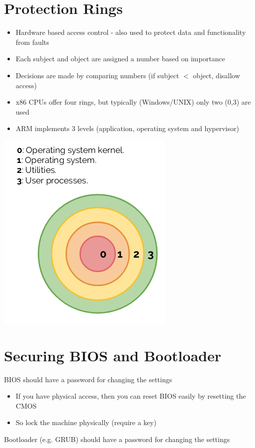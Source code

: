 \documentclass{article}[18pt]
\begin{document}
\section{Protection Rings}
\begin{itemize}
	\item Hardware based access control - also used to protect data and functionality from faults
	\item Each subject and object are assigned a number based on importance
	\item Decisions are made by comparing numbers (if subject $<$ object, disallow access)
	\item x86 CPUs offer four rings, but typically (Windows/UNIX) only two (0,3) are used
	\item ARM implements 3 levels (application, operating system and hypervisor)
\end{itemize}
\begin{center}
	\includegraphics[scale=0.7]{protection_ring}
\end{center}

\section{Securing BIOS and Bootloader}
BIOS should have a password for changing the settings
\begin{itemize}
	\item If you have physical access, then you can reset BIOS easily by resetting the CMOS
	\item So lock the machine physically (require a key)
\end{itemize}
Bootloader (e.g. GRUB) should have a password for changing the settings
\end{document}
